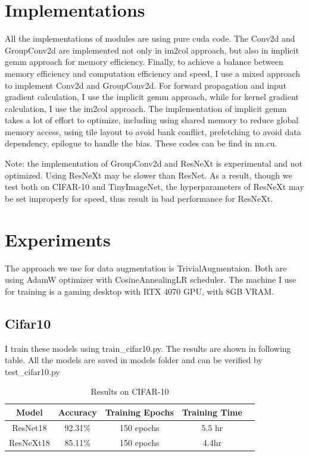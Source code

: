 \documentclass{ctexart}
\begin{document}
\section{Implementations}
All the implementations of modules are using pure cuda code. The Conv2d and GroupConv2d are implemented not only in im2col approach, 
but also in implicit gemm approach for memory efficiency. Finally, to achieve a balance between memory efficiency and computation efficiency and speed,
I use a mixed approach to implement Conv2d and GroupConv2d. For forward propagation and input gradient calculation, I use the implicit gemm approach, 
while for kernel gradient calculation, I use the im2col approach. The implementation of implicit gemm takes a lot of effort to optimize,
including using shared memory to reduce global memory access, using tile layout to avoid bank conflict, prefetching to avoid data dependency, epilogue to handle the bias. These codes can be find in 
nn.cu.

Note: the implementation of GroupConv2d and ResNeXt is experimental and not optimized. Using ResNeXt may be slower than ResNet. As a result, though we test both on CIFAR-10 and TinyImageNet, 
the hyperparameters of ResNeXt may be set improperly for speed, thus result in bad performance for ResNeXt.

\section{Experiments}
The approach we use for data augmentation is TrivialAugmentaion.
Both are using AdamW optimizer with CosineAnnealingLR scheduler.
The machine I use for training is a gaming desktop with RTX 4070 GPU, with 8GB VRAM.
\subsection{Cifar10}
I train these models using train\_cifar10.py.
The results are shown in following table. All the models are saved in models folder and can be verified by test\_cifar10.py

\begin{table}[H]
    \centering
    \begin{tabular}{|c|c|c|c|c|}
        \hline
        Model & Accuracy & Training Epochs & Training Time\\
        \hline
        ResNet18 & 92.31\% & 150 epochs & 5.5 hr \\
        \hline
        ResNeXt18 & 85.11\% & 150 epochs & 4.4hr \\
        \hline
    \end{tabular}
    \caption{Results on CIFAR-10}
    \label{tab:results_cifar10}
\end{table}
\end{document}
